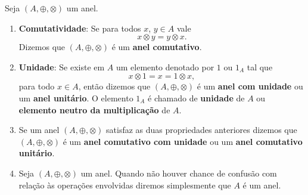 \begin{observacoes}
    Seja $(A, \oplus, \otimes)$ um anel.
    \begin{enumerate}[label={\arabic*})]
        \item \textbf{Comutatividade}: Se para todos $x$, $y \in A$ vale
        \[
            x \otimes y = y \otimes x.
        \]
        Dizemos que $(A, \oplus, \otimes)$ é um \textbf{anel comutativo}.

        \item \textbf{Unidade}: Se existe em $A$ um elemento denotado por $1$ ou $1_{A}$ tal que \[ x \otimes 1 = x = 1 \otimes x, \] para todo $x \in A$, então dizemos que
            $(A, \oplus, \otimes)$ é um \textbf{anel com unidade} ou um \textbf{anel unitário}. O elemento $1_A$ é chamado de \textbf{unidade} de $A$ ou
            \textbf{elemento neutro da multiplicação} de $A$.

        \item Se um anel $(A, \oplus, \otimes)$ satisfaz as duas propriedades anteriores dizemos que $(A, \oplus, \otimes)$ é um \textbf{anel comutativo com unidade} ou um
            \textbf{anel comutativo unitário}.


        \item Seja $(A, \oplus, \otimes)$ um anel. Quando não houver chance de confusão com relação às operações envolvidas diremos simplesmente que $A$ é um anel.
    \end{enumerate}
\end{observacoes}

